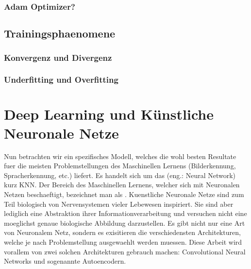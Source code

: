 \subsection{Adam Optimizer?}

\section{Trainingsphaenomene}

\subsection{Konvergenz und Divergenz}
\subsection{Underfitting und Overfitting}


\chapter{Deep Learning und Künstliche Neuronale Netze}
Nun betrachten wir ein spezifisches Modell, welches die wohl besten Resultate
fuer die meisten Problemstellungen des Maschinellen Lernens (Bilderkennung,
Spracherkennung, etc.) liefert. Es handelt sich um das  (eng.: Neural Network) kurz KNN.
Der Bereich des Maschinellen Lernens, welcher sich mit Neuronalen Netzen
beschaeftigt, bezeichnet man als .
\para{}
Kuenstliche Neuronale Netze sind zum Teil biologisch von Nervensystemen vieler
Lebewesen inspiriert.
Sie sind aber lediglich eine Abstraktion ihrer Informationverarbeitung und versuchen nicht eine moeglichst genaue biologische Abbildung darzustellen.
Es gibt nicht nur eine Art von Neuronalem Netz, sondern es exisitieren die
verschiedensten Architekturen, welche je nach Problemstellung ausgewaehlt werden
muessen. Diese Arbeit wird vorallem von zwei solchen Architekturen gebrauch machen:
Convolutional Neural Networks und sogenannte Autoencodern.


